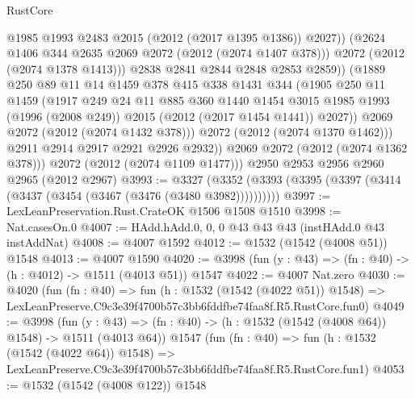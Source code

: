 \begin{lexlean}{RustCore}
\begin{coremodule}
                        @1985
                        @1993
                        @2483
                        @2015
                        (@2012 (@2017 @1395 @1386))
                        @2027))
                    (@2624 @1406 @344 @2635 @2069 @2072 (@2012 (@2074 @1407 @378)))
                    @2072
                    (@2012 (@2074 @1378 @1413)))
                  @2838
                  @2841
                  @2844
                  @2848
                  @2853
                  @2859))
              (@1889
                @250
                @89
                @11
                @14
                @1459
                @378
                @415
                @338
                @1431
                @344
                (@1905
                  @250
                  @11
                  @1459
                  (@1917
                    @249
                    @24
                    @11
                    @885
                    @360
                    @1440
                    @1454
                    @3015
                    @1985
                    @1993
                    (@1996 (@2008 @249))
                    @2015
                    (@2012 (@2017 @1454 @1441))
                    @2027))
                @2069
                @2072
                (@2012 (@2074 @1432 @378)))
              @2072
              (@2012 (@2074 @1370 @1462)))
            @2911
            @2914
            @2917
            @2921
            @2926
            @2932))
        @2069
        @2072
        (@2012 (@2074 @1362 @378)))
      @2072
      (@2012 (@2074 @1109 @1477)))
    @2950
    @2953
    @2956
    @2960
    @2965
    (@2012 @2967)
@3993 := @3327 (@3352 (@3393 (@3395 (@3397 (@3414 (@3437 (@3454 (@3467 (@3476 (@3480 @3982))))))))))
@3997 := LexLeanPreservation.Rust.CrateOK @1506 @1508 @1510
@3998 := Nat.casesOn.{0}
@4007 := HAdd.hAdd.{0, 0, 0} @43 @43 @43 (instHAdd.{0} @43 instAddNat)
@4008 := @4007 @1592
@4012 := @1532 (@1542 (@4008 @51)) @1548
@4013 := @4007 @1590
@4020 := @3998 (fun (y : @43) => (fn : @40) -> (h : @4012) -> @1511 (@4013 @51)) @1547
@4022 := @4007 Nat.zero
@4030 := @4020
    (fun (fn : @40) =>
    fun (h : @1532 (@1542 (@4022 @51)) @1548) =>
    LexLeanPreserve.C9c3e39f4700b57c3bb6fddfbe74faa8f.R5.RustCore.fun0)
@4049 := @3998
    (fun (y : @43) => (fn : @40) -> (h : @1532 (@1542 (@4008 @64)) @1548) -> @1511 (@4013 @64))
    @1547
    (fun (fn : @40) =>
    fun (h : @1532 (@1542 (@4022 @64)) @1548) =>
    LexLeanPreserve.C9c3e39f4700b57c3bb6fddfbe74faa8f.R5.RustCore.fun1)
@4053 := @1532 (@1542 (@4008 @122)) @1548

\end{coremodule}
\end{lexlean}
